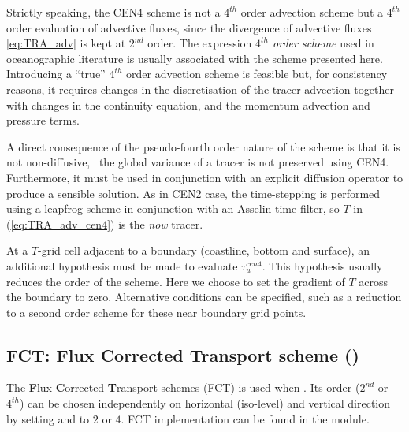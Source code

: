 \documentclass[../main/NEMO_manual]{subfiles}
\begin{document}
Strictly speaking, the CEN4 scheme is not a $4^{th}$ order advection scheme but
a $4^{th}$ order evaluation of advective fluxes,
since the divergence of advective fluxes \autoref{eq:TRA_adv} is kept at $2^{nd}$ order.
The expression \textit{$4^{th}$ order scheme} used in oceanographic literature is
usually associated with the scheme presented here.
Introducing a ``true'' $4^{th}$ order advection scheme is feasible but, for consistency reasons,
it requires changes in the discretisation of the tracer advection together with
changes in the continuity equation, and the momentum advection and pressure terms.

A direct consequence of the pseudo-fourth order nature of the scheme is that it is not non-diffusive,
\ie\ the global variance of a tracer is not preserved using CEN4.
Furthermore, it must be used in conjunction with an explicit diffusion operator to
produce a sensible solution.
As in CEN2 case, the time-stepping is performed using a leapfrog scheme in conjunction with
an Asselin time-filter, so $T$ in (\autoref{eq:TRA_adv_cen4}) is the \textit{now} tracer.

At a $T$-grid cell adjacent to a boundary (coastline, bottom and surface),
an additional hypothesis must be made to evaluate $\tau_u^{cen4}$.
This hypothesis usually reduces the order of the scheme.
Here we choose to set the gradient of $T$ across the boundary to zero.
Alternative conditions can be specified,
such as a reduction to a second order scheme for these near boundary grid points.

\subsection[FCT: Flux Corrected Transport scheme (\forcode{ln_traadv_fct})]{FCT: Flux Corrected Transport scheme (\protect{})}
\label{subsec:TRA_adv_tvd}

The \textbf{F}lux \textbf{C}orrected \textbf{T}ransport schemes (FCT) is used when
.
Its order ($2^{nd}$ or $4^{th}$) can be chosen independently on
horizontal (iso-level) and vertical direction by
setting  and  to $2$ or $4$.
FCT implementation can be found in the  module.
\end{document}
